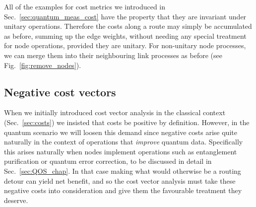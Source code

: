 All of the examples for cost metrics we introduced in Sec.~\ref{sec:quantum_meas_cost} have the property that they are invariant under unitary operations. Therefore the costs along a route may simply be accumulated as before, summing up the edge weights, without needing any special treatment for node operations, provided they are unitary. For non-unitary node processes, we can merge them into their neighbouring link processes as before (see Fig.~\ref{fig:remove_nodes}).

\subsection{Negative cost vectors}

When we initially introduced cost vector analysis in the classical context (Sec.~\ref{sec:costs}) we insisted that costs be positive by definition. However, in the quantum scenario we will loosen this demand since negative costs arise quite naturally in the context of operations that \textit{improve} quantum data. Specifically this arises naturally when nodes implement operations such as entanglement purification or quantum error correction, to be discussed in detail in Sec.~\ref{sec:QOS_chap}. In that case making what would otherwise be a routing detour can yield net benefit, and so the cost vector analysis must take these negative costs into consideration and give them the favourable treatment they deserve.